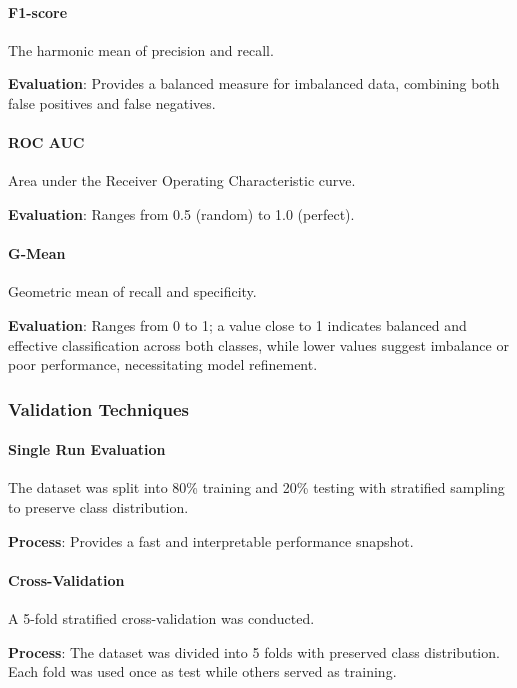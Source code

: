 \documentclass[conference]{IEEEtran}
\begin{document}
\paragraph{F1-score} 

The harmonic mean of precision and recall.  

\textbf{Evaluation}: Provides a balanced measure for imbalanced data, combining both false positives and false negatives.

\paragraph{ROC AUC} 

Area under the Receiver Operating Characteristic curve. 

\textbf{Evaluation}: Ranges from 0.5 (random) to 1.0 (perfect).

\paragraph{G-Mean} 

Geometric mean of recall and specificity.  

\textbf{Evaluation}: Ranges from 0 to 1; a value close to 1 indicates balanced and effective classification across both classes, while lower values suggest imbalance or poor performance, necessitating model refinement.

\subsubsection{Validation Techniques}

\paragraph{Single Run Evaluation}

The dataset was split into 80\% training and 20\% testing with stratified sampling to preserve class distribution.  

\textbf{Process}: Provides a fast and interpretable performance snapshot.

\paragraph{Cross-Validation}

A 5-fold stratified cross-validation was conducted.  

\textbf{Process}: The dataset was divided into 5 folds with preserved class distribution. Each fold was used once as test while others served as training.  
\end{document}
